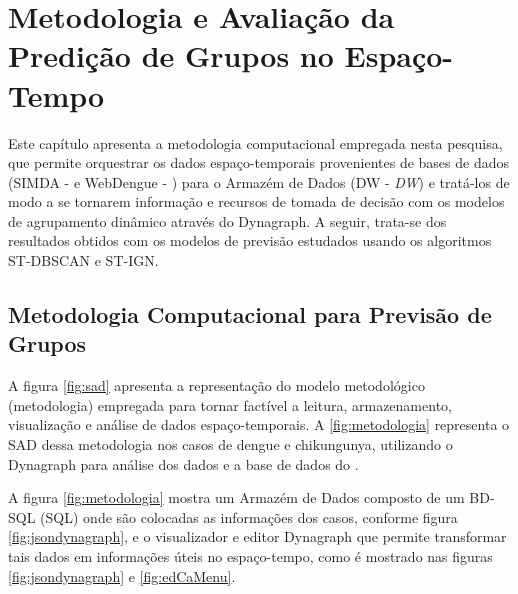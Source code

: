 \chapter{Metodologia e Avaliação da Predição de Grupos no Espaço-Tempo}
\label{chap:avaliacao}

Este capítulo apresenta a metodologia computacional empregada nesta pesquisa, que permite orquestrar os dados espaço-temporais provenientes de bases de dados (\acrshort{SIMDA} - \cite{simda} e WebDengue - \cite{webdengue2011}) para o Armazém de Dados (\acrshort{DW} - \textit{\acrlong{DW}}) e tratá-los de modo a se tornarem informação e recursos de tomada de decisão com os modelos de agrupamento dinâmico através do Dynagraph. A seguir, trata-se dos resultados obtidos com os modelos de previsão estudados usando os algoritmos \acrshort{ST-DBSCAN} e \acrshort{ST-IGN}.

\section{Metodologia Computacional para Previsão de Grupos}

A figura \ref{fig:sad} apresenta a representação do modelo metodológico (metodologia) empregada para tornar factível a leitura, armazenamento, visualização e análise de dados espaço-temporais. A \ref{fig:metodologia} representa o \acrshort{SAD} dessa metodologia nos casos de dengue e chikungunya, utilizando o Dynagraph para análise dos dados e a base de dados do .

\begin{figure}[!ht]
	\centering	
\end{figure}
\FloatBarrier

A figura \ref{fig:metodologia} mostra um Armazém de Dados composto de um \acrfull{BD-SQL} (\acrfull{SQL}) onde são colocadas as informações dos casos, conforme figura \ref{fig:jsondynagraph}, e o visualizador e editor Dynagraph que permite transformar tais dados em informações úteis no espaço-tempo, como é mostrado nas figuras \ref{fig:jsondynagraph} e \ref{fig:edCaMenu}.

